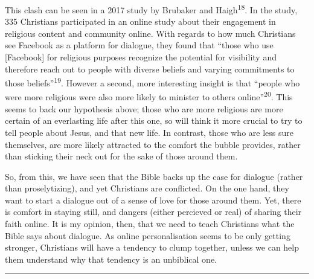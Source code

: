 \documentclass[]{article}
\begin{document}
This clash can be seen in a 2017 study by Brubaker and
Haigh\textsuperscript{18}. In the study, 335 Christians participated in
an online study about their engagement in religious content and
community online. With regards to how much Christians see Facebook as a
platform for dialogue, they found that ``those who use {[}Facebook{]}
for religious purposes recognize the potential for visibility and
therefore reach out to people with diverse beliefs and varying
commitments to those beliefs''\textsuperscript{19}. However a second,
more interesting insight is that ``people who were more religious were
also more likely to minister to others online''\textsuperscript{20}.
This seems to back our hypothesis above; those who are more religious
are more certain of an everlasting life after this one, so will think it
more crucial to try to tell people about Jesus, and that new life. In
contrast, those who are less sure themselves, are more likely attracted
to the comfort the bubble provides, rather than sticking their neck out
for the sake of those around them.

So, from this, we have seen that the Bible backs up the case for
dialogue (rather than proselytizing), and yet Christians are conflicted.
On the one hand, they want to start a dialogue out of a sense of love
for those around them. Yet, there is comfort in staying still, and
dangers (either percieved or real) of sharing their faith online. It is
my opinion, then, that we need to teach Christians what the Bible says
about dialogue. As online personalisation seems to be only getting
stronger, Christians will have a tendency to clump together, unless we
can help them understand why that tendency is an unbiblical one.

\begin{center}\rule{0.5\linewidth}{\linethickness}\end{center}
\end{document}
